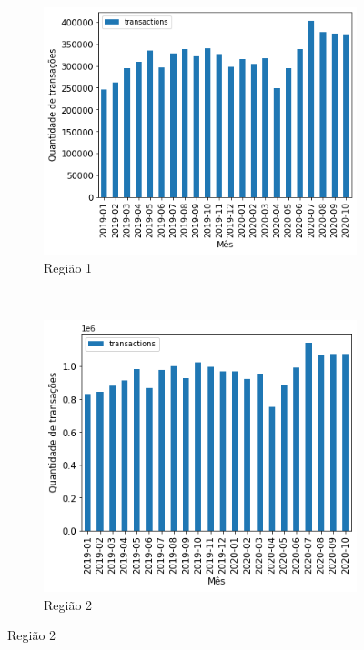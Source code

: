 \begin{figure}[htb] 
    \centering 
    \caption{Valor mensal transacionado por região no período analisado}
    \label{fig:pandemia:descritiva-12-qtde-transacoes-mensal-por-regiao} 
    \begin{subfigure}[b]{0.45\textwidth}
        \includegraphics[scale=0.45]{images/base-de-dados-12.1-qtde-transacoes-mensal-por-regiao.png}
        \caption{Região 1}
        \label{fig:pandemia:descritiva-12.1-qtde-transacoes-mensal-por-regiao}
    \end{subfigure} ~ \quad
    \begin{subfigure}[b]{0.45\textwidth}
        \includegraphics[scale=0.45]{images/base-de-dados-12.2-qtde-transacoes-mensal-por-regiao.png}
        \caption{Região 2}
        \label{fig:pandemia:descritiva-12.2-qtde-transacoes-mensal-por-regiao}

\end{subfigure}
\end{figure}
